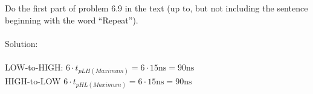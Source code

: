 Do the first part of problem 6.9 in the text (up to, but not including the sentence beginning with the word ``Repeat'').\\ \\

Solution: \\ \\
LOW-to-HIGH: $6 \cdot t_{pLH(Maximum)} = 6 \cdot 15 \textrm{ns} = 90 \textrm{ns}$\\
HIGH-to-LOW $6 \cdot t_{pHL(Maximum)} = 6 \cdot 15 \textrm{ns} = 90 \textrm{ns}$\\
